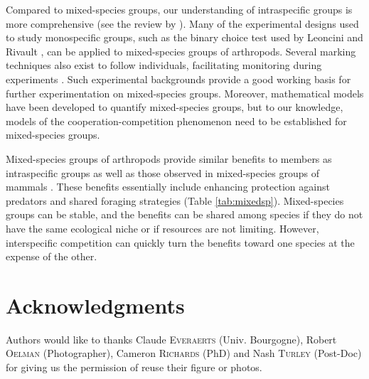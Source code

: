 Compared to mixed-species groups, our understanding of intraspecific groups is more comprehensive (see the review by \citet{jeanson_key_2012}). Many of the experimental designs used to study monospecific groups, such as the binary choice test used by Leoncini and Rivault \cite{leoncini_could_2005}, can be applied to mixed-species groups of arthropods. Several marking techniques also exist to follow individuals, facilitating monitoring during experiments \cite{hagler_methods_2001}. Such experimental backgrounds provide a good working basis for further experimentation on mixed-species groups. Moreover, mathematical models have been developed to quantify mixed-species groups, but to our knowledge, models of the cooperation-competition phenomenon need to be established for mixed-species groups.

Mixed-species groups of arthropods provide similar benefits to members as intraspecific groups as well as those observed in mixed-species groups of mammals \cite{stensland_mixed_2003}. These benefits essentially include enhancing protection against predators and shared foraging strategies (Table \ref{tab:mixedsp}). Mixed-species groups can be stable, and the benefits can be shared among species if they do not have the same ecological niche or if resources are not limiting. However, interspecific competition can quickly turn the benefits toward one species at the expense of the other.

	\section{Acknowledgments}  
Authors would like to thanks Claude \textsc{Everaerts} (Univ. Bourgogne), Robert \textsc{Oelman} (Photographer), Cameron \textsc{Richards} (PhD) and Nash \textsc{Turley} (Post-Doc) for giving us the permission of reuse their figure or photos.


\clearpage
    
    
        
    
    
    
    



